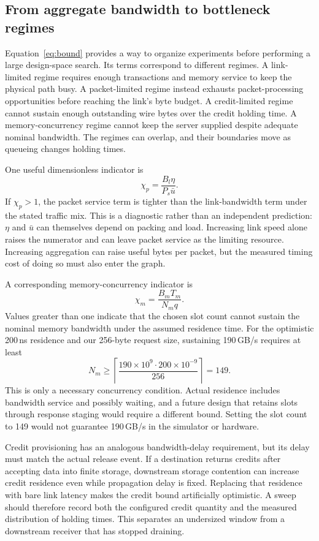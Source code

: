 \subsection{From aggregate bandwidth to bottleneck regimes}
Equation~\ref{eq:bound} provides a way to organize experiments before performing a large design-space search. Its terms correspond to different regimes. A link-limited regime requires enough transactions and memory service to keep the physical path busy. A packet-limited regime instead exhausts packet-processing opportunities before reaching the link's byte budget. A credit-limited regime cannot sustain enough outstanding wire bytes over the credit holding time. A memory-concurrency regime cannot keep the server supplied despite adequate nominal bandwidth. The regimes can overlap, and their boundaries move as queueing changes holding times.

One useful dimensionless indicator is
\begin{equation}
 \chi_p=\frac{B_l\eta}{P_s\bar u}.
\end{equation}
If $\chi_p>1$, the packet service term is tighter than the link-bandwidth term under the stated traffic mix. This is a diagnostic rather than an independent prediction: $\eta$ and $\bar u$ can themselves depend on packing and load. Increasing link speed alone raises the numerator and can leave packet service as the limiting resource. Increasing aggregation can raise useful bytes per packet, but the measured timing cost of doing so must also enter the graph.

A corresponding memory-concurrency indicator is
\begin{equation}
 \chi_m=\frac{B_m T_m}{N_m q}.
\end{equation}
Values greater than one indicate that the chosen slot count cannot sustain the nominal memory bandwidth under the assumed residence time. For the optimistic 200\,ns residence and our 256-byte request size, sustaining 190\,GB/s requires at least
\begin{equation}
 N_m\geq\left\lceil\frac{190\times10^9\cdot200\times10^{-9}}{256}\right\rceil=149.
\end{equation}
This is only a necessary concurrency condition. Actual residence includes bandwidth service and possibly waiting, and a future design that retains slots through response staging would require a different bound. Setting the slot count to 149 would not guarantee 190\,GB/s in the simulator or hardware.

Credit provisioning has an analogous bandwidth-delay requirement, but its delay must match the actual release event. If a destination returns credits after accepting data into finite storage, downstream storage contention can increase credit residence even while propagation delay is fixed. Replacing that residence with bare link latency makes the credit bound artificially optimistic. A sweep should therefore record both the configured credit quantity and the measured distribution of holding times. This separates an undersized window from a downstream receiver that has stopped draining.

